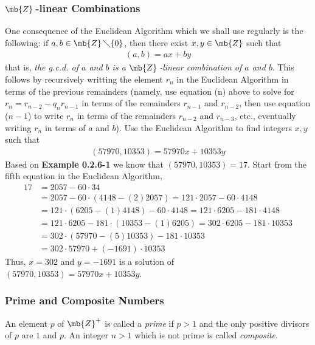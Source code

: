 \subsubsection{\texorpdfstring{$\mb{Z}\,$}{Z}-linear Combinations}
One consequence of the Euclidean Algorithm which we shall use regularly
is the following: if $a,b\in \mb{Z}\,\diagdown\{0\}$, then there exist $x,y\in\mb{Z}$ such that
\begin{align*}
    (a,b) = ax + by
\end{align*}
that is, {\sl the g.c.d. of $a$ and $b$ is a $\mb{Z}\,$-linear combination of $a$ and $b$}.
This follows by recursively writting the element $r_{n}$ in the Euclidean Algorithm in terms of the previous
remainders (namely, use equation (n) above to solve for $r_{n} = r_{n-2} - q_{n}r_{n-1}$
in terms of the remainders $r_{n-1}$ and $r_{n-2}$, then use equation ($n-1$) to write $r_{n}$
in terms of the remainders $r_{n-2}$ and $r_{n-3}$, etc., eventually writing $r_{n}$ in terms of $a$ and $b$).
\newpage
\thispagestyle{evenpagestyle}
{Use the Euclidean Algorithm to find integers $x,y$ such that
\begin{align*}
    (57970, 10353) = 57970x + 10353y
\end{align*}
}
{Based on \textbf{\textsf{\color{blue!60!black} Example 0.2.6-1}}
we know that $(57970, 10353) = 17$. Start from the fifth equation in the Euclidean Algorithm,
\begin{align*}
    17 &= 2057 - 60\cdot 34\\
    &= 2057 - 60\cdot (4148 - (2) 2057) = 121\cdot 2057 - 60\cdot 4148\\
    &= 121\cdot (6205 - (1) 4148) - 60\cdot 4148 = 121\cdot 6205 - 181\cdot 4148\\
    &= 121\cdot 6205 - 181\cdot (10353 - (1) 6205) = 302\cdot 6205 - 181\cdot 10353\\
    &= 302\cdot (57970 - (5) 10353) - 181\cdot 10353\\
    &= 302\cdot 57970 + (-1691)\cdot 10353
\end{align*}
Thus, $x=302$ and $y=-1691$ is a solution of $(57970, 10353) = 57970x + 10353y$.
}

\subsubsection{Prime and Composite Numbers}
An element $p$ of $\mb{Z}^{+}$ is called a {\sl prime} if $p>1$ and the only positive divisors of $p$ are $1$ and $p$.
An integer $n>1$ which is not prime is called {\sl composite}.

